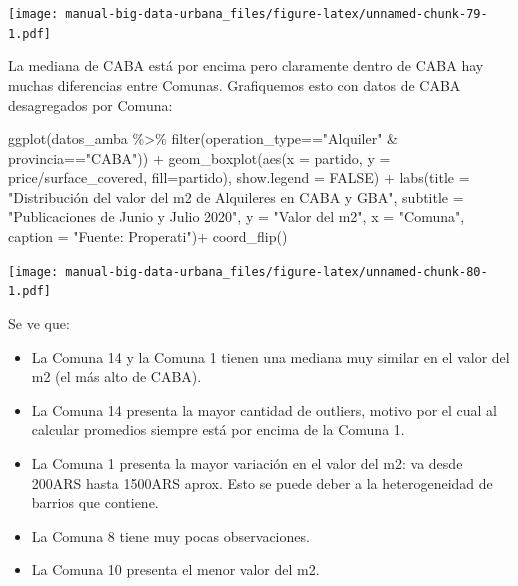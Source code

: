\documentclass[
  spanish,
]{book}
\newenvironment{Shaded}{\begin{snugshade}}{\end{snugshade}}
\newcommand{\AttributeTok}[1]{\textcolor[rgb]{0.77,0.63,0.00}{#1}}
\newcommand{\ConstantTok}[1]{\textcolor[rgb]{0.00,0.00,0.00}{#1}}
\newcommand{\FunctionTok}[1]{\textcolor[rgb]{0.00,0.00,0.00}{#1}}
\newcommand{\NormalTok}[1]{#1}
\newcommand{\SpecialCharTok}[1]{\textcolor[rgb]{0.00,0.00,0.00}{#1}}
\newcommand{\StringTok}[1]{\textcolor[rgb]{0.31,0.60,0.02}{#1}}
\providecommand{\tightlist}{%
  \setlength{\itemsep}{0pt}\setlength{\parskip}{0pt}}
\begin{document}
\texttt{[image: manual-big-data-urbana\_files/figure-latex/unnamed-chunk-79-1.pdf]}

La mediana de CABA está por encima pero claramente dentro de CABA hay muchas diferencias entre Comunas. Grafiquemos esto con datos de CABA desagregados por Comuna:

\begin{Shaded}
\begin{Highlighting}[]
\FunctionTok{ggplot}\NormalTok{(datos\_amba }\SpecialCharTok{\%\textgreater{}\%}
         \FunctionTok{filter}\NormalTok{(operation\_type}\SpecialCharTok{==}\StringTok{"Alquiler"} \SpecialCharTok{\&}\NormalTok{ provincia}\SpecialCharTok{==}\StringTok{"CABA"}\NormalTok{)) }\SpecialCharTok{+}
  \FunctionTok{geom\_boxplot}\NormalTok{(}\FunctionTok{aes}\NormalTok{(}\AttributeTok{x =}\NormalTok{ partido, }\AttributeTok{y =}\NormalTok{ price}\SpecialCharTok{/}\NormalTok{surface\_covered, }\AttributeTok{fill=}\NormalTok{partido), }\AttributeTok{show.legend =} \ConstantTok{FALSE}\NormalTok{) }\SpecialCharTok{+}
  \FunctionTok{labs}\NormalTok{(}\AttributeTok{title =} \StringTok{"Distribución del valor del m2 de Alquileres en CABA y GBA"}\NormalTok{,}
       \AttributeTok{subtitle =} \StringTok{"Publicaciones de Junio y Julio 2020"}\NormalTok{,}
       \AttributeTok{y =} \StringTok{"Valor del m2"}\NormalTok{,}
       \AttributeTok{x =} \StringTok{"Comuna"}\NormalTok{,}
       \AttributeTok{caption =} \StringTok{"Fuente: Properati"}\NormalTok{)}\SpecialCharTok{+}
  \FunctionTok{coord\_flip}\NormalTok{()}
\end{Highlighting}
\end{Shaded}

\texttt{[image: manual-big-data-urbana\_files/figure-latex/unnamed-chunk-80-1.pdf]}

Se ve que:

\begin{itemize}
\tightlist
\item
  La Comuna 14 y la Comuna 1 tienen una mediana muy similar en el valor del m2 (el más alto de CABA).
\item
  La Comuna 14 presenta la mayor cantidad de outliers, motivo por el cual al calcular promedios siempre está por encima de la Comuna 1.
\item
  La Comuna 1 presenta la mayor variación en el valor del m2: va desde 200ARS hasta 1500ARS aprox. Esto se puede deber a la heterogeneidad de barrios que contiene.
\item
  La Comuna 8 tiene muy pocas observaciones.
\item
  La Comuna 10 presenta el menor valor del m2.
\end{itemize}
\end{document}

